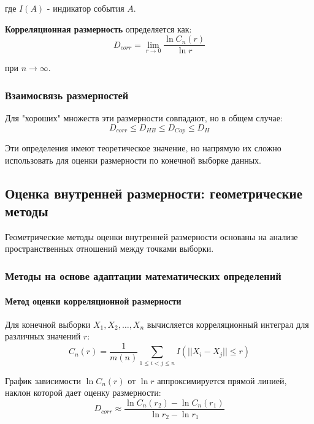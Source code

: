 \documentclass[a4paper,12pt]{article}
\begin{document}
где $I(A)$ - индикатор события $A$.

\textbf{Корреляционная размерность} определяется как:
\begin{equation}
    D_{corr} = \lim_{r \to 0} \frac{\ln C_n(r)}{\ln r}
\end{equation}

при $n \to \infty$.

\subsubsection{Взаимосвязь размерностей}

Для "хороших" множеств эти размерности совпадают, но в общем случае:
\begin{equation}
    D_{corr} \leq D_{HB} \leq D_{Cap} \leq D_H
\end{equation}

Эти определения имеют теоретическое значение, но напрямую их сложно использовать для оценки размерности по конечной выборке данных.

\subsection{Оценка внутренней размерности: геометрические методы}

Геометрические методы оценки внутренней размерности основаны на анализе пространственных отношений между точками выборки.

\subsubsection{Методы на основе адаптации математических определений}

\paragraph{Метод оценки корреляционной размерности}

Для конечной выборки {$X_1, X_2, \ldots, X_n$} вычисляется корреляционный интеграл для различных значений $r$:
\begin{equation}
    C_n(r) = \frac{1}{m(n)} \sum_{1 \leq i < j \leq n} I(||X_i - X_j|| \leq r)
\end{equation}

График зависимости $\ln C_n(r)$ от $\ln r$ аппроксимируется прямой линией, наклон которой дает оценку размерности:
\begin{equation}
    D_{corr} \approx \frac{\ln C_n(r_2) - \ln C_n(r_1)}{\ln r_2 - \ln r_1}
\end{equation}
\end{document}
